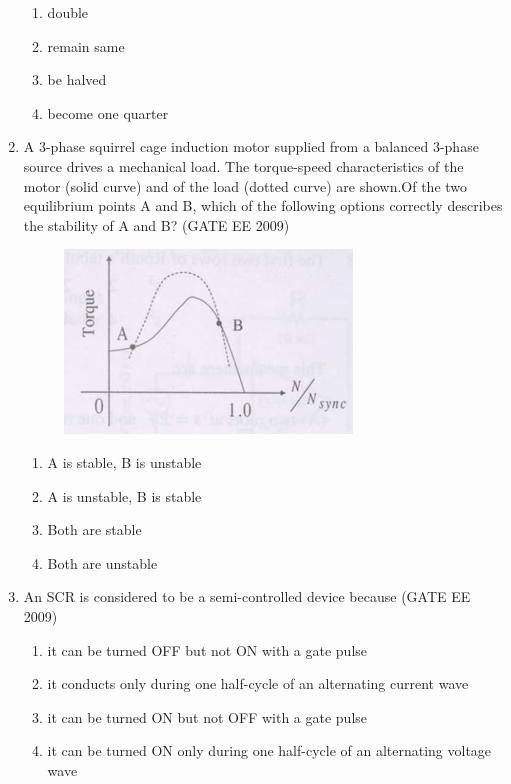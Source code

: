 \documentclass[journal,12pt,onecolumn]{IEEEtran}
\theoremstyle{remark}
\begin{document}
\begin{flushleft}
\begin{enumerate}
\begin{enumerate}
    \item double
     \item remain same
     \item be halved
     \item become one quarter
\end{enumerate}


\item A 3-phase squirrel cage induction motor supplied from a balanced 3-phase source drives a mechanical load. The torque-speed characteristics of the motor (solid curve) and of the load (dotted curve) are shown.Of the two equilibrium points A and B, which of the following options correctly describes the stability of A and B?
\hfill(GATE EE 2009)
\begin{figure}[h!]
    \centering
    \includegraphics[width=0.5\columnwidth]{figs/Screenshot 2025-08-08 191438.png}
    \caption{}
    \label{fig:placeholder}
\end{figure}

\begin{enumerate}
    \item A is stable, B is unstable
    \item A is unstable, B is stable
    \item Both are stable
    \item Both are unstable
\end{enumerate}


\item An SCR is considered to be a semi-controlled device because
\hfill(GATE EE 2009)
\begin{enumerate}
    \item it can be turned OFF but not ON with a gate pulse
    \item it conducts only during one half-cycle of an alternating current wave
    \item it can be turned ON but not OFF with a gate pulse
    \item it can be turned ON only during one half-cycle of an alternating voltage wave
\end{enumerate}



\end{enumerate}
\end{flushleft}
\end{document}
